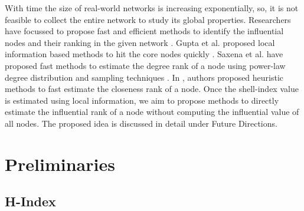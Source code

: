 \documentclass[12pt,3p]{article}
\begin{document}
With time the size of real-world networks is increasing exponentially, so, it is not feasible to collect the entire network to study its global properties. Researchers have focussed to propose fast and efficient methods to identify the influential nodes and their ranking in the given network \cite{saxena2017global}. Gupta et al. proposed local information based methods to hit the core nodes quickly \cite{gupta2016pseudo}. 
Saxena et al. have proposed fast methods to estimate the degree rank of a node using power-law degree distribution \cite{saxena2015rank, saxena2015estimating} and sampling techniques \cite{saxena2017observe, saxena2017degree}. In \cite{saxena2017fast}, authors proposed heuristic methods to fast estimate the closeness rank of a node. 
Once the shell-index value is estimated using local information, we aim to propose methods to directly estimate the influential rank of a node without computing the influential value of all nodes. The proposed idea is discussed in detail under Future Directions.


\section{Preliminaries}\label{prelim}




\subsection{H-Index}\label{hindex}
\end{document}
